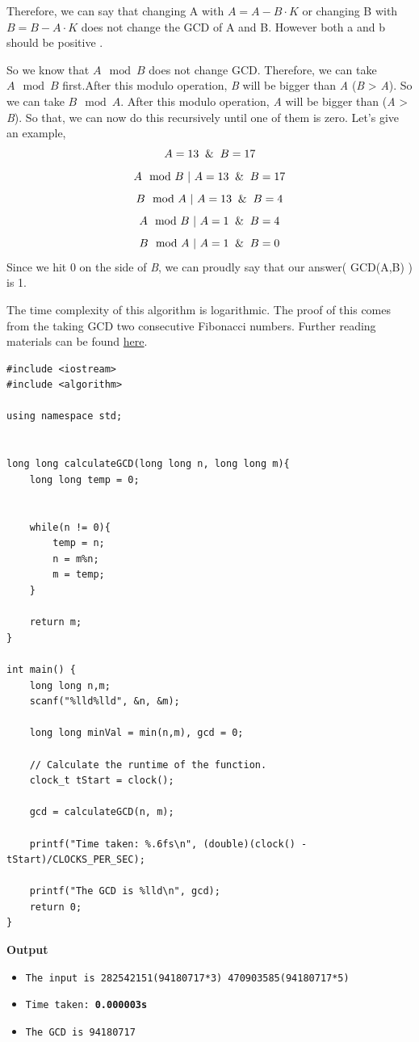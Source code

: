 \documentclass[12pt]{article}
\begin{document}
Therefore, we can say that changing A with $A = A - B \cdot K$ or changing B with  $B = B - A \cdot K$ does not change the GCD of A and B. However both a and b should be positive \cite{euclideangcd}.

So we know that $A \mod B$ does not change GCD. Therefore, we can take $A \mod B$ first.After this modulo operation, \textit{B} will be bigger than \textit{A} (\textit{B} > \textit{A}). So we can take $B \mod A$. After this modulo operation, \textit{A} will be bigger than (\textit{A} > \textit{B}). So that, we can now do this recursively until one of them is zero. Let's give an example,
\[ A = 13 \And B = 17 \]
\[ A \mod{B} \text{  | } A = 13 \And B = 17 \]
\[ B \mod{A} \text{  | } A = 13 \And B = 4 \]
\[ A \mod{B} \text{  | } A = 1 \And B = 4 \]
\[ B \mod{A} \text{  | } A = 1 \And B = 0 \]
Since we hit 0 on the side of \textit{B}, we can proudly say that our answer( GCD(A,B) ) is 1.

The time complexity of this algorithm is logarithmic. The proof of this comes from the taking GCD two consecutive Fibonacci numbers. Further reading materials can be found  \href{http://www.sci.brooklyn.cuny.edu/~amotz/BC-ALGORITHMS/PRESENTATIONS/gcd.pdf}{here}.  
\clearpage

\begin{verbatim}
#include <iostream>
#include <algorithm>

using namespace std;


long long calculateGCD(long long n, long long m){
    long long temp = 0;
    
    
    while(n != 0){
        temp = n;
        n = m%n;
        m = temp;
    }
    
    return m;
}

int main() {
    long long n,m;
    scanf("%lld%lld", &n, &m);
    
    long long minVal = min(n,m), gcd = 0;
    
    // Calculate the runtime of the function.
    clock_t tStart = clock();
    
    gcd = calculateGCD(n, m);
    
    printf("Time taken: %.6fs\n", (double)(clock() - tStart)/CLOCKS_PER_SEC);
    
    printf("The GCD is %lld\n", gcd);
    return 0;
}
\end{verbatim}
\textbf{Output}

\begin{itemize}
  \item \texttt{The input is 282542151(94180717*3) 470903585(94180717*5)} 
  \item \texttt{Time taken: \textbf{0.000003s}} 
  \item \texttt{The GCD is 94180717}
\end{itemize}
\end{document}
